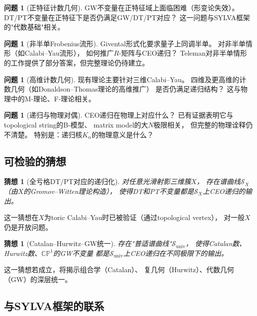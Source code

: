 \documentclass[11pt,a4paper]{article}
\theoremstyle{plain}
\newtheorem{conjecture}[theorem]{猜想}
\theoremstyle{definition}
\newtheorem{problem}[theorem]{问题}
\newcommand{\CP}{\mathbb{CP}}
\begin{document}
\begin{problem}[正特征计数几何]\label{prob:poschar}
GW不变量在正特征域上面临困难（形变论失效）。
DT/PT不变量在正特征下是否仍满足GW/DT/PT对应？
这一问题与SYLVA框架的"代数基础"相关。
\end{problem}

\begin{problem}[非半单Frobenius流形]\label{prob:nonsimplex}
Givental形式化要求量子上同调半单。
对非半单情形（如Calabi--Yau流形），
如何推广$R$-矩阵与CEO递归？
Teleman对非半单情形的工作提供了部分答案，但完整理论仍待建立。
\end{problem}

\begin{problem}[高维计数几何]\label{prob:highdim}
现有理论主要针对三维Calabi--Yau。
四维及更高维的计数几何（如Donaldson--Thomas理论的高维推广）
是否仍满足递归结构？
这与物理中的M-理论、F-理论相关。
\end{problem}

\begin{problem}[递归与物理对偶]\label{prob:physics}
CEO递归在物理上对应什么？
已有证据表明它与topological string的B-模型、
matrix model的大$N$极限相关，
但完整的物理诠释仍不清楚。
特别是：递归核$K_\alpha$的物理意义是什么？
\end{problem}

\subsection{可检验的猜想}

\begin{conjecture}[全亏格DT/PT对应的递归化]\label{conj:dtprec}
对任意光滑射影三维簇$X$，
存在谱曲线$\mathcal{S}_X$（由$X$的Gromov--Witten理论构造），
使得DT和PT不变量都是$\mathcal{S}_X$上CEO递归的输出。
\end{conjecture}

这一猜想在$X$为toric Calabi--Yau时已被验证（通过topological vertex），
对一般$X$仍是开放问题。

\begin{conjecture}[Catalan--Hurwitz--GW统一]\label{conj:CHG}
存在"普适谱曲线"$\mathcal{S}_{\mathrm{univ}}$，
使得Catalan数、Hurwitz数、$\CP^1$的GW不变量
都是$\mathcal{S}_{\mathrm{univ}}$上CEO递归在不同极限下的输出。
\end{conjecture}

这一猜想若成立，将揭示组合学（Catalan）、
复几何（Hurwitz）、代数几何（GW）的深层统一。

\subsection{与SYLVA框架的联系}
\end{document}
